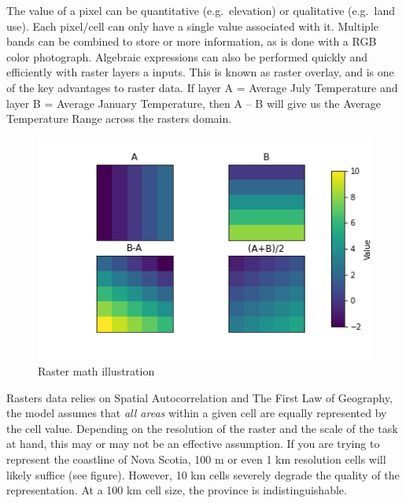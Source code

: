 \documentclass[
]{book}
\begin{document}
The value of a pixel can be quantitative (e.g.~elevation) or qualitative (e.g.~land use). Each pixel/cell can only have a single value associated with it. Multiple bands can be combined to store or more information, as is done with a RGB color photograph. Algebraic expressions can also be performed quickly and efficiently with raster layers a inputs. This is known as raster overlay, and is one of the key advantages to raster data. If layer A = Average July Temperature and layer B = Average January Temperature, then A -- B will give us the Average Temperature Range across the rasters domain.

\begin{figure}
\centering
\includegraphics{images/03-raster-overlay.png}
\caption{Raster math illustration}
\end{figure}

Rasters data relies on Spatial Autocorrelation and The First Law of Geography, the model assumes that \emph{all areas} within a given cell are equally represented by the cell value. Depending on the resolution of the raster and the scale of the task at hand, this may or may not be an effective assumption. If you are trying to represent the coastline of Nova Scotia, 100 m or even 1 km resolution cells will likely suffice (see figure). However, 10 km cells severely degrade the quality of the representation. At a 100 km cell size, the province is indistinguishable.
\end{document}

